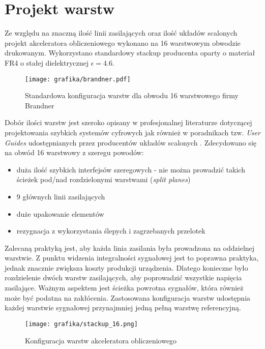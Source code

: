 \section{Projekt warstw}
Ze względu na znaczną ilość linii zasilających oraz ilość układów scalonych projekt akceleratora obliczeniowego wykonano na 16 warstwowym obwodzie drukowanym. Wykorzystano standardowy stackup producenta oparty o materiał FR4 o stałej dielektrycznej $\epsilon = 4.6$. 


\begin{figure}[!ht]
\centering
\texttt{[image: grafika/brandner.pdf]}
\caption{Standardowa konfiguracja warstw dla obwodu 16 warstwowego firmy Brandner}
\end{figure}

Dobór ilości warstw jest szeroko opisany w profesjonalnej literaturze dotyczącej projektowania szybkich systemów cyfrowych \cite{BOOK:HIGH_SPEED} \cite{BOOK:BLACK_MAGIC} jak również w poradnikach tzw. \textit{User Guides} udostępnianych przez producentów układów scalonych \cite{UG_STACKUP1} \cite{UG_STACKUP2}. Zdecydowano się na obwód 16 warstwowy z szeregu powodów:

\begin{itemize}
\item
duża ilość szybkich interfejsów szeregowych - nie można prowadzić takich ścieżek pod/nad rozdzielonymi warstwami  (\textit{split planes})
\item
9 głównych linii zasilających
\item
duże upakowanie elementów
\item
rezygnacja z wykorzystania ślepych i zagrzebanych przelotek
\end{itemize}

Zalecaną praktyką jest, aby każda linia zasilania była prowadzona na oddzielnej warstwie. Z punktu widzenia integralności sygnałowej jest to poprawna praktyka, jednak znacznie zwiększa koszty produkcji urządzenia. Dlatego konieczne było rozdzielenie dwóch warstw zasilających, aby poprowadzić wszystkie napięcia zasilające. Ważnym aspektem jest ścieżka powrotna sygnałów, która również może być podatna na zakłócenia. Zastosowana konfiguracja warstw udostępnia każdej warstwie sygnałowej przynajmniej jedną pełną warstwę referencyjną.  

\begin{figure}[!ht]
\centering
\texttt{[image: grafika/stackup\_16.png]}
\caption{Konfiguracja warstw akceleratora obliczeniowego}
\end{figure}

